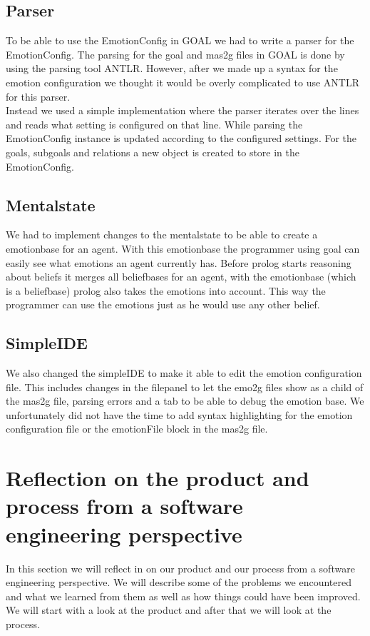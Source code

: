 \documentclass[11pt]{article}
\begin{document}
\subsection{Parser}
To be able to use the EmotionConfig in GOAL we had to write a parser for the EmotionConfig. The parsing for the goal and mas2g files in GOAL is done by using the parsing tool ANTLR. However, after we made up a syntax for the emotion configuration we thought it would be overly complicated to use ANTLR for this parser.\\
Instead we used a simple implementation where the parser iterates over the lines and reads what setting is configured on that line. While parsing the EmotionConfig instance is updated according to the configured settings. For the goals, subgoals and relations a new object is created to store in the EmotionConfig. 

\subsection{Mentalstate}
We had to implement changes to the mentalstate to be able to create a emotionbase for an agent. With this emotionbase the programmer using goal can easily see what emotions an agent currently has. Before prolog starts reasoning about beliefs it merges all beliefbases for an agent, with the emotionbase (which is a beliefbase) prolog also takes the emotions into account. This way the programmer can use the emotions just as he would use any other belief.

\subsection{SimpleIDE}
We also changed the simpleIDE to make it able to edit the emotion configuration file. This includes changes in the filepanel to let the emo2g files show as a child of the mas2g file, parsing errors and a tab to be able to debug the emotion base. We unfortunately did not have the time to add syntax highlighting for the emotion configuration file or the emotionFile block in the mas2g file. 

\clearpage

\section{Reflection on the product and process from a software engineering perspective}
In this section we will reflect in on our product and our process from a software engineering perspective. We will describe some of the problems we encountered and what we learned from them as well as how things could have been improved. We will start with a look at the product and after that we will look at the process.
\end{document}
